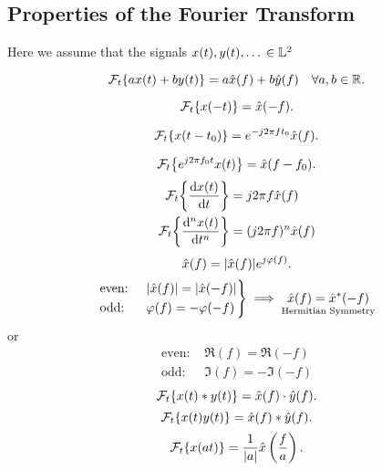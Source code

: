 \documentclass{report}
\newcommand{\Ft}[1]{\SF_t\!\lt\{ #1 \rt\}}
\begin{document}
\subsection{Properties of the Fourier Transform}

Here we assume that the signals $x(t),y(t),\dots\,\in\mathbb{L}^2$

\begin{description}
	\ii[Linearity]
	\[
		\Ft{ax(t) + by(t)} = a\hat{x}(f) + b\hat{y}(f) \quad \forall a,b \in \RR
		.\]

	\ii[Inverse]
	\[
		\Ft{x(-t)} = \hat{x}(-f)
		.\]

	\[
		\Ft{x(t-t_0)} = e^{-j2\pi ft_0}\hat{x}(f)
		.\]

	\ii[Modulation]
	\[
		\Ft{e^{j2\pi f_0t}x(t)} = \hat{x}(f-f_0)
		.\]
	\ii[Differentiation]
	\begin{align*}
		\Ft{\dv{x(t)}{t}}    & = j2\pi f\hat{x}(f)     \\
		\Ft{\dv[n]{x(t)}{t}} & = (j2\pi f)^n\hat{x}(f)
	\end{align*}
	\ii[Symmetry]
	\[
		\hat{x}(f) = \abs{\hat{x}(f)} e^{j \varphi(f)}
		.\]
	\[
		\begin{rcases}
			\text{even: } & \abs{\hat{x}(f)} = \abs{\hat{x}(-f)} \\
			\text{odd: }  & \varphi(f) = -\varphi(-f)
		\end{rcases} \implies \underset{\text{Hermitian Symmetry}}{\hat{x}(f) = \hat{x}^*(-f)}
	\]
	or
	\begin{align*}
		\text{even: } & \Re(f) = \Re(-f)  \\
		\text{odd: }  & \Im(f) = -\Im(-f)
	\end{align*}
	\ii[Convolution]
	\[
		\Ft{x(t) * y(t)} = \hat{x}(f)\cdot\hat{y}(f)
		.\]
	\ii[Product]
	\[
		\Ft{x(t)y(t)} = \hat{x}(f) * \hat{y}(f)
		.\]
	\ii[Scaling]
	\[
		\Ft{x(at)} = \frac{1}{\abs{a}}\hat{x}\lt(\frac{f}{a}\rt)
		.\]
\end{description}

\end{document}
